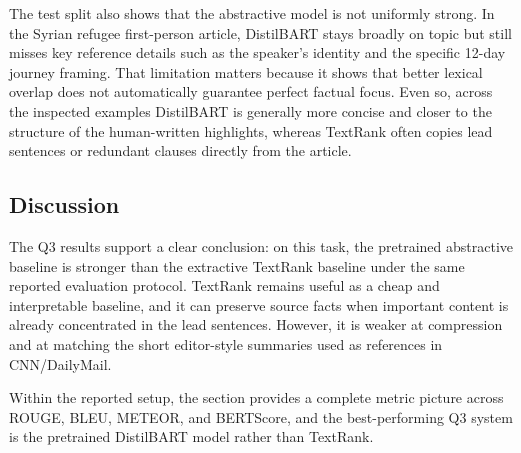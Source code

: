 The test split also shows that the abstractive model is not uniformly strong. In the Syrian refugee first-person article, DistilBART stays broadly on topic but still misses key reference details such as the speaker's identity and the specific 12-day journey framing. That limitation matters because it shows that better lexical overlap does not automatically guarantee perfect factual focus. Even so, across the inspected examples DistilBART is generally more concise and closer to the structure of the human-written highlights, whereas TextRank often copies lead sentences or redundant clauses directly from the article.

\subsection{Discussion}

The Q3 results support a clear conclusion: on this task, the pretrained abstractive baseline is stronger than the extractive TextRank baseline under the same reported evaluation protocol. TextRank remains useful as a cheap and interpretable baseline, and it can preserve source facts when important content is already concentrated in the lead sentences. However, it is weaker at compression and at matching the short editor-style summaries used as references in CNN/DailyMail.

Within the reported setup, the section provides a complete metric picture across ROUGE, BLEU, METEOR, and BERTScore, and the best-performing Q3 system is the pretrained DistilBART model rather than TextRank.